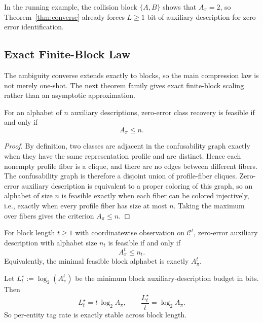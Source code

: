 In the running example, the collision block $\{A,B\}$ shows that $A_\pi = 2$, so Theorem~\ref{thm:converse} already forces $L \ge 1$ bit of auxiliary description for zero-error identification.

\subsection{Exact Finite-Block Law}

The ambiguity converse extends exactly to blocks, so the main compression law is not merely one-shot. The next theorem family gives exact finite-block scaling rather than an asymptotic approximation.

\begin{theorem}\label{thm:graph-one-shot-threshold}
For an alphabet of $n$ auxiliary descriptions, zero-error class recovery is feasible if and only if
\[
A_\pi \le n.
\]
\end{theorem}

\begin{proof}
By definition, two classes are adjacent in the confusability graph exactly when they have the same representation profile and are distinct. Hence each nonempty profile fiber is a clique, and there are no edges between different fibers. The confusability graph is therefore a disjoint union of profile-fiber cliques. Zero-error auxiliary description is equivalent to a proper coloring of this graph, so an alphabet of size $n$ is feasible exactly when each fiber can be colored injectively, i.e., exactly when every profile fiber has size at most $n$. Taking the maximum over fibers gives the criterion $A_\pi \le n$.
\end{proof}

\begin{theorem}\label{thm:graph-block-threshold}
For block length $t\ge 1$ with coordinatewise observation on $\mathcal{C}^t$, zero-error auxiliary description with alphabet size $n_t$ is feasible if and only if
\[
A_\pi^t \le n_t.
\]
Equivalently, the minimal feasible block alphabet is exactly $A_\pi^t$.
\end{theorem}

\begin{corollary}\label{cor:graph-logbit-scaling}
Let $L_t^\star := \log_2(A_\pi^t)$ be the minimum block auxiliary-description budget in bits. Then
\[
L_t^\star = t\,\log_2 A_\pi,
\qquad
\frac{L_t^\star}{t} = \log_2 A_\pi.
\]
So per-entity tag rate is exactly stable across block length.
\end{corollary}

